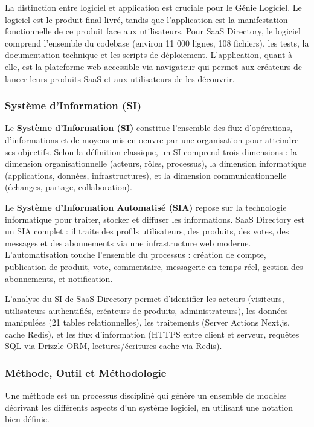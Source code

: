 La distinction entre logiciel et application est cruciale pour le Génie Logiciel. Le logiciel est le produit final livré, tandis que l'application est la manifestation fonctionnelle de ce produit face aux utilisateurs. Pour SaaS Directory, le logiciel comprend l'ensemble du codebase (environ 11 000 lignes, 108 fichiers), les tests, la documentation technique et les scripts de déploiement. L'application, quant à elle, est la plateforme web accessible via navigateur qui permet aux créateurs de lancer leurs produits SaaS et aux utilisateurs de les découvrir.

\subsubsection{Système d'Information (SI)}

Le \textbf{Système d'Information (SI)} constitue l'ensemble des flux d'opérations, d'informations et de moyens mis en oeuvre par une organisation pour atteindre ses objectifs. Selon la définition classique, un SI comprend trois dimensions : la dimension organisationnelle (acteurs, rôles, processus), la dimension informatique (applications, données, infrastructures), et la dimension communicationnelle (échanges, partage, collaboration).

Le \textbf{Système d'Information Automatisé (SIA)} repose sur la technologie informatique pour traiter, stocker et diffuser les informations. SaaS Directory est un SIA complet : il traite des profils utilisateurs, des produits, des votes, des messages et des abonnements via une infrastructure web moderne. L'automatisation touche l'ensemble du processus : création de compte, publication de produit, vote, commentaire, messagerie en temps réel, gestion des abonnements, et notification.

L'analyse du SI de SaaS Directory permet d'identifier les acteurs (visiteurs, utilisateurs authentifiés, créateurs de produits, administrateurs), les données manipulées (21 tables relationnelles), les traitements (Server Actions Next.js, cache Redis), et les flux d'information (HTTPS entre client et serveur, requêtes SQL via Drizzle ORM, lectures/écritures cache via Redis).

\subsubsection{Méthode, Outil et Méthodologie}

\begin{definitionbox}[title={Définition : Méthode (Grady Booch, 1994)}]
Une méthode est un processus discipliné qui génère un ensemble de modèles décrivant les différents aspects d'un système logiciel, en utilisant une notation bien définie.
\end{definitionbox}

